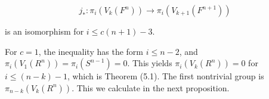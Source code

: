 $$j_*: \pi_i(V_k(F^n)) \rightarrow \pi_i(V_{k+1}(F^{n+1}))$$

is an isomorphism for $i \leq c(n+1) - 3$.

For $c = 1$, the inequality has the form $i \leq n - 2$, and $\pi_i(V_1(R^n)) = \pi_i(S^{n-1}) = 0$. This yields $\pi_i(V_k(R^n)) = 0$ for $i \leq (n-k) - 1$, which is Theorem (5.1). The first nontrivial group is $\pi_{n-k}(V_k(R^n))$. This we calculate in the next proposition.
